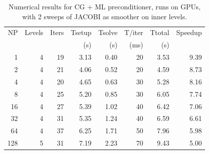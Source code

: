 \begin{table}[h!]
\centering
\caption{Numerical results for CG + ML preconditioner, runs on GPUs, with 2 sweeps of JACOBI as smoother on inner levels.}
\label{gpu-jac}
\begin{tabular}{rrrrrrrr}
NP  & Levels & Iters & Tsetup & Tsolve & T/iter & Ttotal & Speedup\\
    &        &       & (s)    & (s)    & (ms)   & (s)   &  \\
\hline
1   & 4       & 19  & 3.13  & 0.40 & 20   & 3.53 & 9.39  \\
2   & 4       & 21  & 4.06  & 0.52 & 20   & 4.59 & 8.73  \\
4   & 4       & 20  & 4.65  & 0.63 & 30   & 5.28 & 8.16  \\
8   & 4       & 25  & 5.20  & 0.85 & 30   & 6.05 & 7.74  \\
16  & 4       & 27  & 5.39  & 1.02 & 40   & 6.42 & 7.06  \\
32  & 4       & 31  & 5.35  & 1.24 & 40   & 6.59 & 6.61  \\
64  & 4       & 37  & 6.25  & 1.71 & 50   & 7.96 & 5.98  \\ 
128 & 5       & 31  & 7.19  & 2.23 & 70   & 9.43 & 5.00  \\
\hline
\end{tabular}
\end{table}
\else

